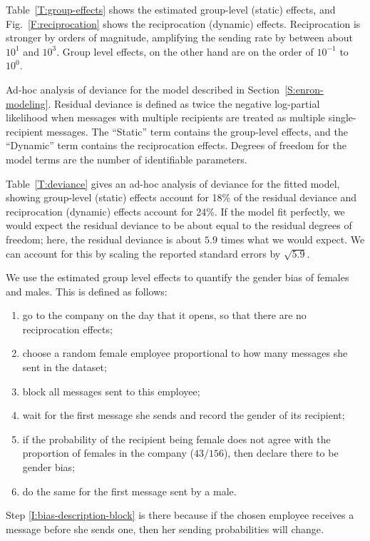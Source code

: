 \documentclass[aoas,preprint]{imsart}
\begin{document}
Table~\ref{T:group-effects} shows the estimated group-level
(static) effects, and Fig.~\ref{F:reciprocation} shows the reciprocation
(dynamic) effects.  Reciprocation is stronger by orders of magnitude,
amplifying the sending rate by between about $10^1$ and $10^3$.  Group level
effects, on the other hand are on the order of $10^{-1}$ to $10^0$.

\begin{table}[h]
    
    \caption{
        Ad-hoc analysis of deviance for the model described in
        Section~\ref{S:enron-modeling}.  Residual deviance is defined as twice
        the negative log-partial likelihood when messages with multiple
        recipients are treated as multiple single-recipient messages.  The
        ``Static'' term contains the group-level effects, and the ``Dynamic''
        term contains the reciprocation effects.   Degrees of freedom for the
        model terms are the number of identifiable parameters.
    }
    \label{T:deviance}
\end{table}

Table~\ref{T:deviance} gives an ad-hoc analysis of deviance for the fitted
model, showing group-level (static) effects account for 18\% of the
residual deviance and reciprocation (dynamic) effects account for 24\%.
If the model fit perfectly, we would expect the residual deviance to be
about equal to the residual degrees of freedom; here, the residual deviance
is about $5.9$ times what we would expect.  We can account for this by
scaling the reported standard errors by $\sqrt{5.9}$.

We use the estimated group level effects to quantify the gender bias of
females and males.  This is defined as follows:
\begin{enumerate}
    \item go to the company on the day that it opens, so that there are no
          reciprocation effects;
    \item choose a random female employee proportional to how many
          messages she sent in the dataset;
    \item \label{I:bias-description-block}
          block all messages sent to this employee;
    \item wait for the first message she sends and record the gender
          of its recipient;
    \item if the probability of the recipient being female does not
          agree with the proportion of females in the company ($43 / 156$),
          then declare there to be gender bias;
    \item do the same for the first message sent by a male.
\end{enumerate}
Step \ref{I:bias-description-block} is there because if the chosen
employee receives a message before she sends one, then her sending
probabilities will change.  
\end{document}

